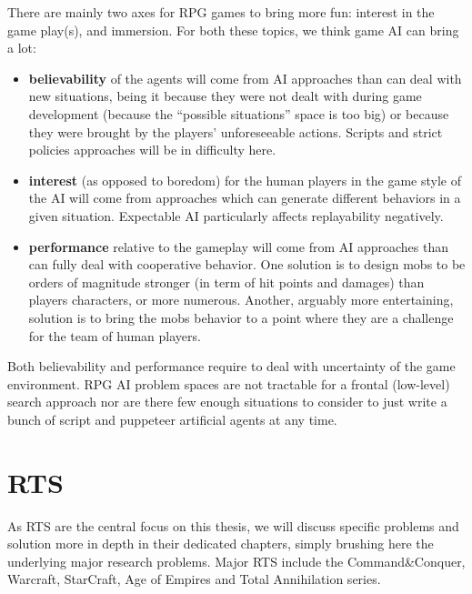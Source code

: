 There are mainly two axes for RPG games to bring more fun: interest in the game play(s), and immersion. For both these topics, we think game AI can bring a lot:
\begin{itemize}
    \item \textbf{believability} of the agents will come from AI approaches than can deal with new situations, being it because they were not dealt with during game development (because the ``possible situations'' space is too big) or because they were brought by the players' unforeseeable actions. Scripts and strict policies approaches will be in difficulty here. %
    \item \textbf{interest} (as opposed to boredom) for the human players in the game style of the AI will come from approaches which can generate different behaviors in a given situation. Expectable AI particularly affects replayability negatively.
    \item \textbf{performance} relative to the gameplay will come from AI approaches than can fully deal with cooperative behavior. One solution is to design mobs to be orders of magnitude stronger (in term of hit points and damages) than players characters, or more numerous. Another, arguably more entertaining, solution is to bring the mobs behavior to a point where they are a challenge for the team of human players.
\end{itemize}
Both believability and performance require to deal with uncertainty of the game environment. RPG AI problem spaces are not tractable for a frontal (low-level) search approach nor are there few enough situations to consider to just write a bunch of script and puppeteer artificial agents at any time.


\section{RTS}
As RTS are the central focus on this thesis, we will discuss specific problems and solution more in depth in their dedicated chapters, simply brushing here the underlying major research problems. Major RTS include the Command\&Conquer, Warcraft, StarCraft, Age of Empires and Total Annihilation series.

